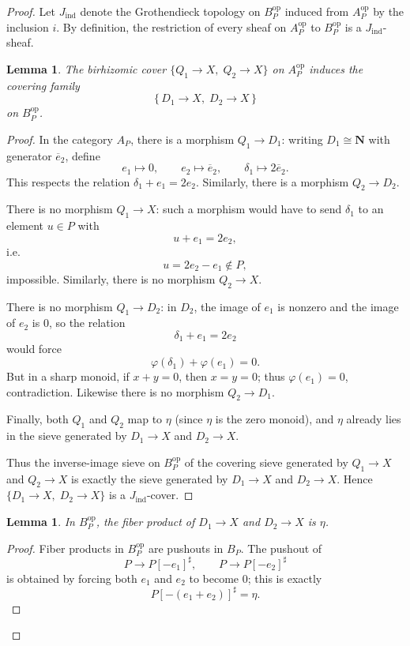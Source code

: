 \documentclass[11pt]{article}
\newtheorem{lemma}[theorem]{Lemma}
\begin{document}
\begin{proof}
Let \(J_{\mathrm{ind}}\) denote the Grothendieck topology on \(B_P^{\mathrm{op}}\) induced from \(A_P^{\mathrm{op}}\) by the inclusion \(i\). By definition, the restriction of every sheaf on \(A_P^{\mathrm{op}}\) to \(B_P^{\mathrm{op}}\) is a \(J_{\mathrm{ind}}\)-sheaf.

\begin{lemma}\label{lemma:pullback-cover}
The birhizomic cover \(\{Q_1\to X,\;Q_2\to X\}\) on \(A_P^{\mathrm{op}}\) induces the covering family
\[
\{\,D_1\to X,\; D_2\to X\,\}
\]
on \(B_P^{\mathrm{op}}\).
\end{lemma}

\begin{proof}
In the category \(A_P\), there is a morphism \(Q_1\to D_1\): writing \(D_1\cong \mathbf N\) with generator \(\overline e_2\), define
\[
e_1\mapsto 0,\qquad e_2\mapsto \overline e_2,\qquad \delta_1\mapsto 2\overline e_2.
\]
This respects the relation \(\delta_1+e_1=2e_2\). Similarly, there is a morphism \(Q_2\to D_2\).

There is no morphism \(Q_1\to X\): such a morphism would have to send \(\delta_1\) to an element \(u\in P\) with
\[
u+e_1=2e_2,
\]
i.e.
\[
u=2e_2-e_1\notin P,
\]
impossible. Similarly, there is no morphism \(Q_2\to X\).

There is no morphism \(Q_1\to D_2\): in \(D_2\), the image of \(e_1\) is nonzero and the image of \(e_2\) is \(0\), so the relation
\[
\delta_1+e_1=2e_2
\]
would force
\[
\varphi(\delta_1)+\varphi(e_1)=0.
\]
But in a sharp monoid, if \(x+y=0\), then \(x=y=0\); thus \(\varphi(e_1)=0\), contradiction. Likewise there is no morphism \(Q_2\to D_1\).

Finally, both \(Q_1\) and \(Q_2\) map to \(\eta\) (since \(\eta\) is the zero monoid), and \(\eta\) already lies in the sieve generated by \(D_1\to X\) and \(D_2\to X\).

Thus the inverse-image sieve on \(B_P^{\mathrm{op}}\) of the covering sieve generated by \(Q_1\to X\) and \(Q_2\to X\) is exactly the sieve generated by \(D_1\to X\) and \(D_2\to X\). Hence \(\{D_1\to X,\;D_2\to X\}\) is a \(J_{\mathrm{ind}}\)-cover.
\end{proof}

\begin{lemma}\label{lemma:fiberproduct}
In \(B_P^{\mathrm{op}}\), the fiber product of \(D_1\to X\) and \(D_2\to X\) is \(\eta\).
\end{lemma}

\begin{proof}
Fiber products in \(B_P^{\mathrm{op}}\) are pushouts in \(B_P\). The pushout of
\[
P\to P[-e_1]^\sharp,\qquad P\to P[-e_2]^\sharp
\]
is obtained by forcing both \(e_1\) and \(e_2\) to become \(0\); this is exactly
\[
P[-(e_1+e_2)]^\sharp=\eta.
\]
\end{proof}


\end{proof}
\end{document}
